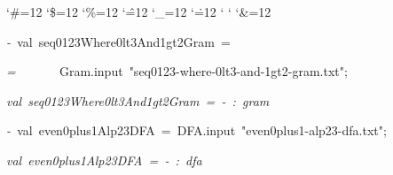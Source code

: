\begin{list}{}
{\setlength{\leftmargin}{\leftmargini}
\setlength{\rightmargin}{0cm}
\setlength{\itemindent}{0cm}
\setlength{\listparindent}{0cm}
\setlength{\itemsep}{0cm}
\setlength{\parsep}{0cm}
\setlength{\labelsep}{0cm}
\setlength{\labelwidth}{0cm}
\catcode`\#=12
\catcode`\$=12
\catcode`\%=12
\catcode`\^=12
\catcode`\_=12
\catcode`\.=12
\catcode`
\catcode`
\catcode`\&=12
\ttfamily}
\small
\item[]\textsl{-\ }val\ seq0123Where0lt3And1gt2Gram\ =
\item[]\textsl{=\ }\ \ \ \ \ \ Gram.input\ "seq0123-where-0lt3-and-1gt2-gram.txt";
\item[]\textsl{val\ seq0123Where0lt3And1gt2Gram\ =\ -\ :\ gram}
\item[]\textsl{-\ }val\ even0plus1Alp23DFA\ =\ DFA.input\ "even0plus1-alp23-dfa.txt";
\item[]\textsl{val\ even0plus1Alp23DFA\ =\ -\ :\ dfa}
\end{list}
